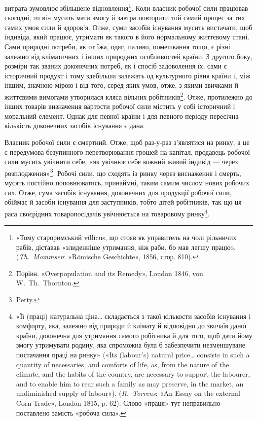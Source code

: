 \parcont{}  %
витрата зумовлює збільшене відновлення\footnote{
«Тому староримський villicus, що стояв як управитель на чолі
рільничих рабів, діставав «злиденніше утримання, ніж раби, бо мав
легшу працю». (\emph{Th.~Mommsen}: «Römische Geschichte», 1856, стор. 810).
}. Коли власник
робочої сили працював сьогодні, то він мусить мати змогу й завтра
повторити той самий процес за тих самих умов сили й здоров’я.
Отже, суми засобів існування мусить вистачати, щоб індивіда,
який працює, утримати як такого в його нормальному життєвому
стані. Сами природні потреби, як от їжа, одяг, паливо, помешкання
тощо, є різні залежно від кліматичних і інших природних
особливостей країни. З другого боку, розміри так званих доконечних
потреб, як і спосіб задоволення їх, сами є історичний
продукт і тому здебільша залежать од культурного рівня країни
і, між іншим, значною мірою і від того, серед яких умов, отже,
з якими звичками й життєвими вимогами утворилася кляса вільних
робітників\footnote{
Порівн. «Overpopulation and its Remedy», London 1846, von W.~Th.~Thornton.
}. Отже, протилежно до інших товарів визначення
вартости робочої сили містить у собі історичний і моральний
елемент. Однак для певної країни і для певного періоду пересічна
кількість доконечних засобів існування є дана.

Власник робочої сили є смертний. Отже, щоб раз-у-раз
з’являтися на ринку, а це є передумова безупинного перетворювання
грошей на капітал, продавець робочої сили мусить увічнити
себе, «як увічнює себе кожний живий індивід — через
розплодження»\footnote{
Petty.
}. Робочі сили, що сходять із ринку через виснаження
і смерть, мусять постійно поповнюватись, принаймні,
таким самим числом нових робочих сил. Отже, сума засобів
існування, доконечних для продукції робочої сили, обіймає й
засоби існування для заступників, тобто дітей робітників, так
що ця раса своєрідних товаропосідачів увічнюється на товаровому
ринку\footnote{
«Її (праці) натуральна ціна\dots{} складається з такої кількости засобів
існування і комфорту, яка, залежно від природи й клімату й відповідно
до звичаїв даної країни, доконечна для утримання самого робітника
й для того, щоб дати йому змогу утримувати родину, яка спроможна
була б забезпечити незменшуване постачання праці на ринку» («Its
(labour’s) natural price\dots{} consists in such a quantity of necessaries, and
comforts of life, as, from the nature of the climate, and the habits of the
country, are necessary to support the labourer, and to enable him to rear
such a family as may preserve, in the market, an undiminished supply of
labour»). (\emph{R.~Torrens}: «An Essay on the external Corn Trade», London
1815, p. 62). Слово «праця» тут неправильно поставлено замість «робоча
сила».
}.

